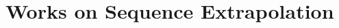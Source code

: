 \documentclass{article}
\begin{document}
\section*{Works on Sequence Extrapolation}
\nocite{Persson, SimonKotovsky}
\nocite{Laird, Pivar}
\nocite{colton00automatic}



\end{document}
